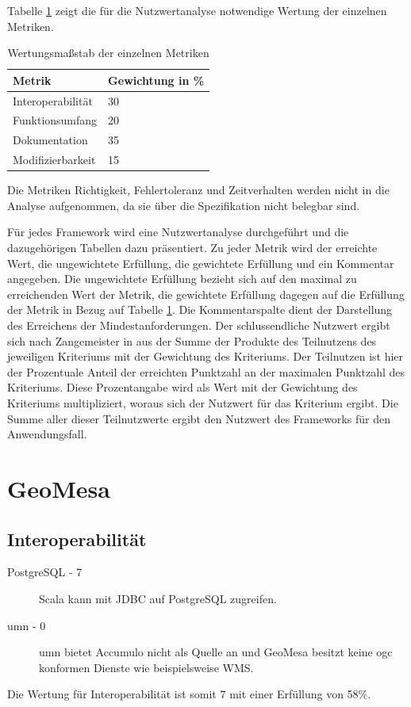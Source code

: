 Tabelle \ref{table:Wertungsmassstab} zeigt die für die Nutzwertanalyse notwendige Wertung der einzelnen Metriken.
\begin{table}[h]
\centering
\begin{tabular}{l|l}
\textbf{Metrik} & \textbf{Gewichtung in \%} \\ \hline
Interoperabilität & 30 \\ \hline
Funktionsumfang & 20 \\ \hline
Dokumentation & 35 \\ \hline
Modifizierbarkeit & 15
\end{tabular}
\caption{Wertungsmaßstab der einzelnen Metriken}
\label{table:Wertungsmassstab}
\end{table}
Die Metriken Richtigkeit, Fehlertoleranz und Zeitverhalten werden nicht in die Analyse aufgenommen, da sie über die Spezifikation nicht belegbar sind.

Für jedes Framework wird eine Nutzwertanalyse durchgeführt und die dazugehörigen Tabellen dazu präsentiert.
Zu jeder Metrik wird der erreichte Wert, die ungewichtete Erfüllung, die gewichtete Erfüllung und ein Kommentar angegeben.
Die ungewichtete Erfüllung bezieht sich auf den maximal zu erreichenden Wert der Metrik, die gewichtete Erfüllung dagegen auf die Erfüllung der Metrik in Bezug auf Tabelle \ref{table:Wertungsmassstab}.
Die Kommentarspalte dient der Darstellung des Erreichens der Mindestanforderungen.
Der schlussendliche Nutzwert ergibt sich nach Zangemeister in \cite{website:nutzwertanalyse} aus der Summe der Produkte des Teilnutzens des jeweiligen Kriteriums mit der Gewichtung des Kriteriums.
Der Teilnutzen ist hier der Prozentuale Anteil der erreichten Punktzahl an der maximalen Punktzahl des Kriteriums.
Diese Prozentangabe wird als Wert mit der Gewichtung des Kriteriums multipliziert, woraus sich der Nutzwert für das Kriterium ergibt.
Die Summe aller dieser Teilnutzwerte ergibt den Nutzwert des Frameworks für den Anwendungsfall.

\section{GeoMesa}

\subsection{Interoperabilität}
\begin{description}
\item[PostgreSQL - 7] Scala  kann mit JDBC auf PostgreSQL zugreifen.
\item[\Gls{umn} - 0] \Gls{umn} bietet Accumulo nicht als Quelle an und GeoMesa besitzt keine \Gls{ogc} konformen Dienste wie beispielsweise WMS.
\end{description}
Die Wertung für Interoperabilität ist somit 7 mit einer Erfüllung von 58\%.

